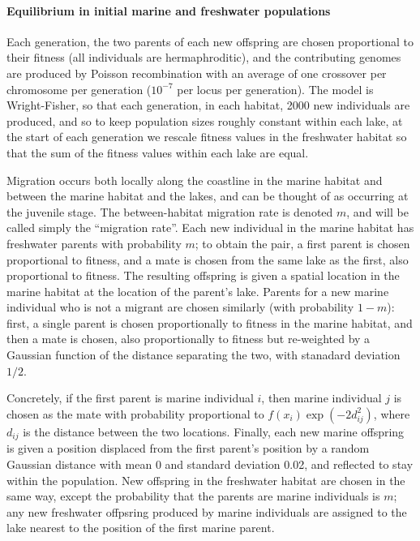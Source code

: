 \documentclass{article}
\begin{document}
\paragraph{Equilibrium in initial marine and freshwater populations} 
Each generation, the two parents of each new offspring are chosen proportional to their fitness 
(all individuals are hermaphroditic),
and the contributing genomes are produced by Poisson recombination with an average of one crossover per chromosome per generation 
($10^{-7}$ per locus per generation). 
The model is Wright-Fisher, so that each generation, in each habitat, 
2000 new individuals are produced, and so to keep population sizes roughly constant within each lake, 
at the start of each generation we rescale fitness values in the freshwater habitat so that the sum of the fitness values within each lake are equal.

Migration occurs both locally along the coastline in the marine habitat and between the marine habitat and the lakes, and can be thought of as occurring at the juvenile stage. 
The between-habitat migration rate is denoted $m$, and will be called simply the ``migration rate''. 
Each new individual in the marine habitat has freshwater parents with probability $m$; 
to obtain the pair, a first parent is chosen proportional to fitness, and a mate is chosen from the same lake as the first, also proportional to fitness. 
The resulting offspring is given a spatial location in the marine habitat at the location of the parent's lake. 
Parents for a new marine individual who is not a migrant are chosen similarly (with probability $1-m$): 
first, a single parent is chosen proportionally to fitness in the marine habitat,
and then a mate is chosen, also proportionally to fitness but re-weighted by a Gaussian function of the distance separating the two, with stanadard deviation $1/2$. 

Concretely, if the first parent is marine individual $i$, then marine individual $j$ is chosen as the mate with probability proportional to $f(x_i) \exp(-2d_{ij}^2)$,
where $d_{ij}$ is the distance between the two locations. 
Finally, each new marine offspring is given a position displaced from the first parent's position by a random Gaussian distance with mean 0 and standard deviation 0.02, 
and reflected to stay within the population. 
New offspring in the freshwater habitat are chosen in the same way, except the probability that the parents are marine individuals is $m$; 
any new freshwater offpsring produced by marine individuals are assigned to the lake nearest to the position of the first marine parent.
\end{document}
